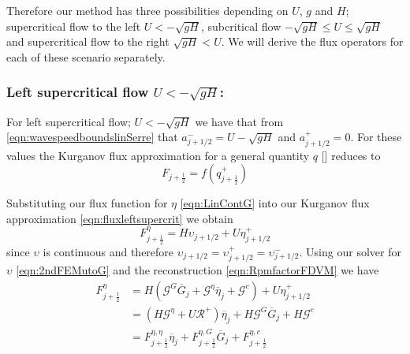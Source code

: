 Therefore our method has three possibilities depending on $U$, $g$ and $H$;  supercritical flow to the left $U < - \sqrt{gH}$, subcritical flow $-\sqrt{gH} \le U \le \sqrt{gH}$ and supercritical flow to the right $\sqrt{gH} < U$. We will derive the flux operators for each of these scenario separately.

\subsubsection{Left supercritical flow $U < - \sqrt{gH}$:}
For left supercritical flow; $U < - \sqrt{gH}$  we have that from \eqref{eqn:wavespeedboundslinSerre} that $a^-_{j+ 1/2} = U - \sqrt{g H}$ and $a^+_{j+ 1/2} =  0$. For these values the Kurganov flux approximation for a general quantity $q$ [] reduces to 
\begin{equation}
F_{j+\frac{1}{2}} = f\left(q^+_{j+\frac{1}{2}}\right)
\label{eqn:fluxleftsupercrit}
\end{equation}

Substituting our flux function for $\eta$ \eqref{eqn:LinContG} into our Kurganov flux approximation \eqref{eqn:fluxleftsupercrit} we obtain
\begin{equation*}
F^\eta_{j+\frac{1}{2}} = H \upsilon_{j+1/2} + U \eta^+_{j+1/2}
\end{equation*}
since $\upsilon$ is continuous and therefore $\upsilon_{j+1/2} = \upsilon_{j+1/2}^+ = \upsilon_{j+1/2}^- $. Using our solver for $\upsilon$ \eqref{eqn:2ndFEMutoG} and the reconstruction \eqref{eqn:RpmfactorFDVM} we have
\begin{align}
F^\eta_{j+\frac{1}{2}} &= H \left(\mathcal{G}^G \overline{G}_{j} + \mathcal{G}^{\eta} \overline{\eta}_{j} + \mathcal{G}^c\right) + U \eta^+_{j+1/2} \nonumber \\ &= \left(H \mathcal{G}^{\eta} + U \mathcal{R}^+ \right)  \overline{\eta}_{j} + H \mathcal{G}^G \overline{G}_{j} + H\mathcal{G}^c \nonumber \\
&= F^{\eta, \eta}_{j+\frac{1}{2}} \overline{\eta}_{j} + F^{\eta, G}_{j+\frac{1}{2}} \overline{G}_{j} + F^{\eta, c}_{j+\frac{1}{2}}
\label{eqn:Fluxfactorsupercritetaleft}
\end{align}

